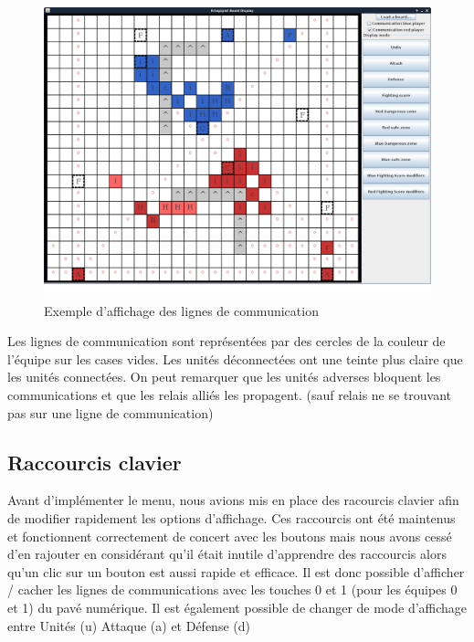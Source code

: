 			\begin{figure}[!h]
			\centerline{\includegraphics[scale=0.35]{images/screen_com.png}}
			\caption{Exemple d'affichage des lignes de communication}
			\end{figure}
			Les lignes de communication sont représentées par des cercles de la couleur de l'équipe sur les cases vides.
			Les unités déconnectées ont une teinte plus claire que les unités connectées.
			On peut remarquer que les unités adverses bloquent les communications et que les relais alliés les propagent. 
			(sauf relais ne se trouvant pas sur une ligne de communication)
			
			\clearpage

		\subsection{Raccourcis clavier}
			Avant d'implémenter le menu, nous avions mis en place des racourcis clavier afin de modifier rapidement les options d'affichage.
			Ces raccourcis ont été maintenus et fonctionnent correctement de concert avec les boutons mais nous avons cessé d'en rajouter 
			en considérant qu'il était inutile d'apprendre des raccourcis alors qu'un clic sur un bouton est aussi rapide et efficace.
			Il est donc possible d'afficher / cacher les lignes de communications avec les touches 0 et 1 (pour les équipes 0 et 1) du pavé numérique.
			Il est également possible de changer de mode d'affichage entre Unités (u) Attaque (a) et Défense (d)
